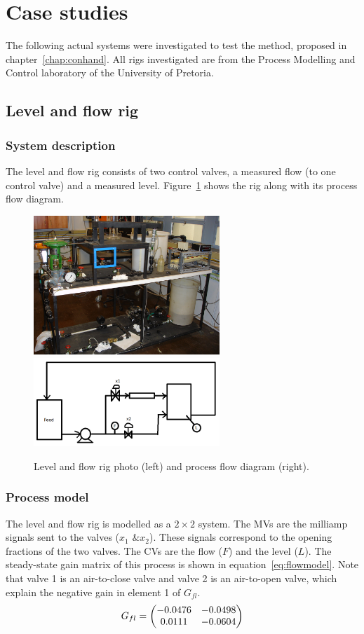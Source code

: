 \section{Case studies}
The following actual systems were investigated to test the method, proposed in chapter~\ref{chap:conhand}.
All rigs investigated are from the Process Modelling and Control laboratory of the University of Pretoria.

\subsection{Level and flow rig}
\subsubsection{System description}
The level and flow rig consists of two control valves, a measured flow (to one control valve) and a measured level.
Figure~\ref{fig:flowphoto} shows the rig along with its process flow diagram.
\begin{figure}[htbp]
  \centering
    \includegraphics[width=7cm]{graph/flowphoto.JPG}
    \qquad
    \includegraphics[width=7cm]{graph/flowpfd}
  \caption[Level and flow rig photo and flow diagram]{Level and flow rig photo (left) and process flow diagram (right).}
  \label{fig:flowphoto}
\end{figure}

\subsubsection{Process model}
The level and flow rig is modelled as a $2\times2$ system.
The MVs are the milliamp signals sent to the valves ($x_1\text{ \& }x_2$).
These signals correspond to the opening fractions of the two valves.
The CVs are the flow ($F$) and the level ($L$).
The steady-state gain matrix of this process is shown in equation~\ref{eq:flowmodel}.
Note that valve 1 is an air-to-close valve and valve 2 is an air-to-open valve, which explain the negative gain in element 1 of $G_{fl}$.
\begin{equation}
  \label{eq:flowmodel}
    G_{fl} = \bpm -0.0476 & -0.0498 \\      %
                  0.0111 & -0.0604 \\ \epm %
\end{equation}

